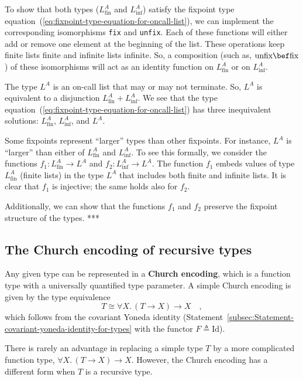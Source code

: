 To show that both types ($L_{\text{fin}}^{A}$ and $L_{\text{inf}}^{A}$)
satisfy the fixpoint type equation~(\ref{eq:fixpoint-type-equation-for-oncall-list}),
we can implement the corresponding isomorphisms \lstinline!fix!
and \lstinline!unfix!.
Each of these functions will either add or remove one element at the
beginning of the list. These operations keep finite lists finite and
infinite lists infinite. So, a composition (such as, $\text{unfix}\bef\text{fix}$)
of these isomorphisms will act as an identity function on $L_{\text{fin}}^{A}$
or on $L_{\text{inf}}^{A}$.

The type $L^{A}$ is an on-call list that may or may not terminate.
So, $L^{A}$ is equivalent to a disjunction $L_{\text{fin}}^{A}+L_{\text{inf}}^{A}$.
We see that the type equation~(\ref{eq:fixpoint-type-equation-for-oncall-list})
has three inequivalent solutions: $L_{\text{fin}}^{A}$, $L_{\text{inf}}^{A}$,
and $L^{A}$.

Some fixpoints represent \textsf{``}larger\textsf{''} types than other fixpoints.
For instance, $L^{A}$ is \textsf{``}larger\textsf{''} than either of $L_{\text{fin}}^{A}$
and $L_{\text{inf}}^{A}$. To see this formally, we consider the functions
$f_{1}:L_{\text{fin}}^{A}\rightarrow L^{A}$ and $f_{2}:L_{\text{inf}}^{A}\rightarrow L^{A}$.
The function $f_{1}$ embeds values of type $L_{\text{fin}}^{A}$
(finite lists) in the type $L^{A}$ that includes both finite and
infinite lists. It is clear that $f_{1}$ is injective; the same holds
also for $f_{2}$.

Additionally, we can show that the functions $f_{1}$ and $f_{2}$
preserve the fixpoint structure of the types. {*}{*}{*}

\subsection{The Church encoding of recursive types}

Any given type can be represented in a \textbf{Church encoding},
which is a function type with a universally quantified type parameter.
A simple Church encoding is given by the type equivalence
\[
T\cong\forall X.\,\left(T\rightarrow X\right)\rightarrow X\quad,
\]
which follows from the covariant Yoneda identity (Statement~\ref{subsec:Statement-covariant-yoneda-identity-for-types}
with the functor $F\triangleq\text{Id}$). 

There is rarely an advantage in replacing a simple type $T$ by a
more complicated function type, $\forall X.\,(T\rightarrow X)\rightarrow X$.
However, the Church encoding has a different form when $T$ is a recursive
type.

